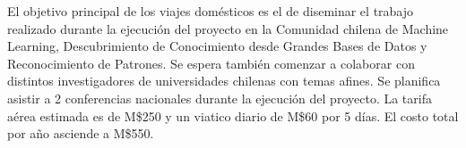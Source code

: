 \documentclass[10pt]{article}
\begin{document}
El objetivo principal de los viajes domésticos es el de diseminar el trabajo realizado durante la ejecución del proyecto en la Comunidad chilena de Machine Learning, Descubrimiento de Conocimiento desde Grandes Bases de Datos y Reconocimiento de Patrones. Se espera también comenzar a colaborar con distintos investigadores de universidades chilenas con temas afines. Se planifica asistir a 2 conferencias nacionales durante la ejecución del proyecto. La tarifa aérea estimada es de M\$250 y un viatico diario de M\$60 por 5 días. El costo total por año asciende a M\$550.


\begin{comment}
\pagebreak{}
\noindent \textbf{\uppercase{OPERATIONAL EXPENSES: }}

\vspace{15pt}
\noindent In the following table indicate the estimated annual cost of one or more items
necessary for a successful development of the proposal. Insert or delete as many
rows as needed.

\begin{center}


\end{comment}
\end{document}
